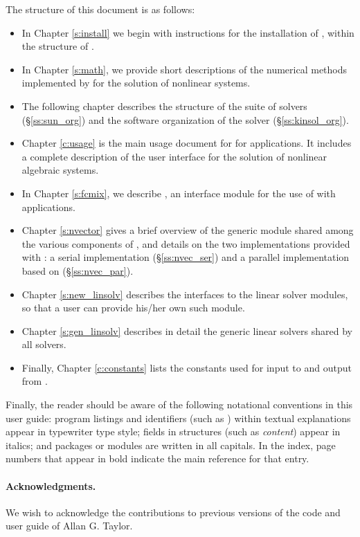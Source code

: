 The structure of this document is as follows:
\begin{itemize}
\item
  In Chapter \ref{s:install} we begin with instructions for the installation
  of {\kinsol}, within the structure of {\sundials}.
\item
  In Chapter \ref{s:math}, we provide short descriptions of the numerical
  methods implemented by {\kinsol} for the solution of nonlinear systems.
\item
  The following chapter describes the structure of the {\sundials} suite
  of solvers (\S\ref{ss:sun_org}) and the software organization of the {\kinsol}
  solver (\S\ref{ss:kinsol_org}).
\item
  Chapter \ref{c:usage} is the main usage document for {\kinsol} for {\C} applications.
  It includes a complete description of the user interface for the solution
  of nonlinear algebraic systems.
\item
  In Chapter \ref{s:fcmix}, we describe {\fkinsol}, an interface module for the
  use of {\kinsol} with {\F} applications.
\item
  Chapter \ref{s:nvector} gives a brief overview of the generic {\nvector} module
  shared among the various components of {\sundials}, and details on the two
  {\nvector} implementations provided with {\sundials}: a serial implementation
  (\S\ref{ss:nvec_ser}) and a parallel implementation based on {\mpi} 
  (\S\ref{ss:nvec_par}).
\item
  Chapter \ref{s:new_linsolv} describes the interfaces to the linear solver
  modules, so that a user can provide his/her own such module.
\item
  Chapter \ref{s:gen_linsolv} describes in detail the generic linear solvers
  shared by all {\sundials} solvers.
\item
  Finally, Chapter \ref{c:constants} lists the constants used for input to
  and output from {\kinsol}.
\end{itemize}

Finally, the reader should be aware of the following notational
conventions in this user guide:  program listings and identifiers
(such as ) within textual explanations appear in
typewriter type style; fields in {\C} structures (such as {\em
content}) appear in italics; and packages or modules are written
in all capitals. In the index, page numbers that appear in bold
indicate the main reference for that entry.

\paragraph{Acknowledgments.}
We wish to acknowledge the contributions to previous versions of the
{\kinsol} code and user guide of Allan G. Taylor.
